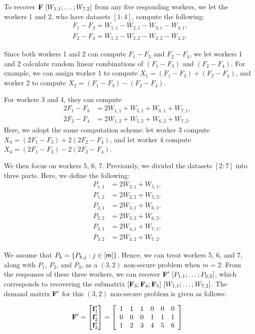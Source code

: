 \documentclass[conference,letterpaper]{IEEEtran}
\begin{document}
\begin{example}
To recover ${\bf F} \ [W_{1,1}; \ldots; W_{7,2}]$ from any five responding workers, we let the workers 1 and 2, who have datasets $[1:4]$, compute the following:
\begin{align*}
& F_1 - F_3 = W_{1,1} - W_{2,1} - W_{3,1} - W_{4,1}, \\
& F_2 - F_4 = W_{1,2} - W_{2,2} - W_{3,2} - W_{4,2}.
\end{align*}

Since both workers 1 and 2 can compute $F_1 - F_3$ and $F_2 - F_4$, we let workers 1 and 2 calculate random linear combinations of $(F_1 - F_3)$ and $(F_2 - F_4)$. For example, we can assign worker 1 to compute $X_1 = (F_1 - F_3) + (F_2 - F_4)$, and worker 2 to compute $X_2 = (F_1 - F_3) - (F_2 - F_4)$.

For workers 3 and 4, they can compute
\begin{align*}
    2F_1 - F_3 &= 2W_{1,1} + W_{5,1} + W_{6,1} + W_{7,1}, \\
    2F_2 - F_4 &= 2W_{1,2} + W_{5,2} + W_{6,2} + W_{7,2}.
\end{align*}
Here, we adopt the same computation scheme: let worker 3 compute $X_3 = (2F_1 - F_3) + 2(2F_2 - F_4)$, and let worker 4 compute $X_4 = (2F_1 - F_3) - 2(2F_2 - F_4)$.

We then focus on workers 5, 6, 7. Previously, we divided the datasets $[2:7]$ into three parts. Here, we define the following:
\begin{align*}
    P_{1,1} &= 2W_{2,1} + W_{5,1}, \\
    P_{1,2} &= 2W_{2,2} + W_{5,2}, \\
    P_{2,1} &= 2W_{3,1} + W_{6,1}, \\
    P_{2,2} &= 2W_{3,2} + W_{6,2}, \\
    P_{3,1} &= 2W_{4,1} + W_{7,1}, \\
    P_{3,2} &= 2W_{4,2} + W_{7,2}.
\end{align*}

We assume that $P_{k} = \{P_{k,j} : j \in [{\sf m}]\}$. Hence, we can treat workers 5, 6, and 7, along with $P_1$, $P_2$, and $P_3$, as a $(3,2)$ non-secure problem when $m=2$. From the responses of these three workers, we can recover ${\bf F}^{\prime} \ [P_{1,1}; \ldots; P_{3,2}]$, which corresponds to recovering the submatrix $[{{\bf F}_3 }; {{\bf F}_4 }; {{\bf F}_5 }] \ [W_{1,1}; \ldots; W_{7,2}]$. The demand matrix ${\bf F}^{\prime}$ for this $(3,2)$ non-secure problem is given as follows:


\begin{equation}
 {{\bf F}^{\prime}} = \begin{bmatrix}  
 {{\bf f}}_1 ^{\prime} \\
 {{\bf f}}_2 ^{\prime} \\
{{\bf f}}_3 ^{\prime}
 \end{bmatrix}
 = \left[
 \begin{array}{cccccc}
   1&1&1&0&0&0 \\
   0 & 0 & 0 & 1 & 1 & 1 \\
  1 & 2 & 3 &  4 & 5 & 6 \\
 \end{array}
 \right]
\end{equation}


\end{example}
\end{document}
